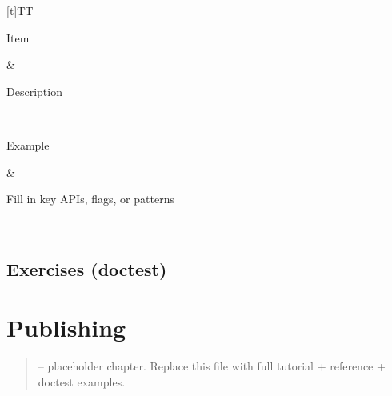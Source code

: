 \documentclass[a4paper,11pt,english]{sphinxmanual}
\begin{document}
\begin{savenotes}\sphinxattablestart
\sphinxthistablewithglobalstyle
\centering
\begin{tabulary}{\linewidth}[t]{TT}
\sphinxtoprule
\begin{varwidth}[t]{}
\sphinxstyletheadfamily \sphinxAtStartPar
Item
\sphinxbeforeendvarwidth
\end{varwidth}%
&\begin{varwidth}[t]{}
\sphinxstyletheadfamily \sphinxAtStartPar
Description
\sphinxbeforeendvarwidth
\end{varwidth}%
\\
\sphinxmidrule
\sphinxtableatstartofbodyhook\begin{varwidth}[t]{}
\sphinxAtStartPar
Example
\sphinxbeforeendvarwidth
\end{varwidth}%
&\begin{varwidth}[t]{}
\sphinxAtStartPar
Fill in key APIs, flags, or patterns
\sphinxbeforeendvarwidth
\end{varwidth}%
\\
\sphinxbottomrule
\end{tabulary}
\sphinxtableafterendhook\par
\sphinxattableend\end{savenotes}


\subsection{Exercises (doctest)}
\label{\detokenize{packaging/building:exercises-doctest}}
\begin{sphinxVerbatim}[commandchars=\\\{\}]
\end{sphinxVerbatim}

\sphinxstepscope


\section{Publishing}
\label{\detokenize{packaging/publishing:publishing}}\label{\detokenize{packaging/publishing::doc}}\begin{quote}

\sphinxAtStartPar
{} – placeholder chapter. Replace this file with full tutorial + reference + doctest examples.
\end{quote}
\end{document}
